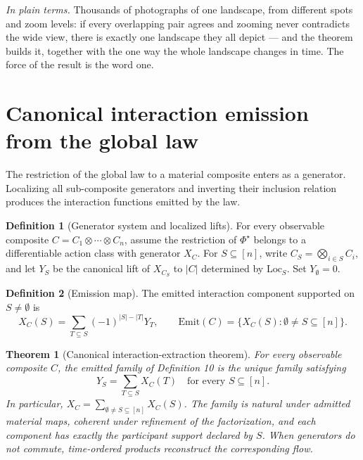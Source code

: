 \documentclass[11pt]{article}
\newtheorem{theorem}{Theorem}
\theoremstyle{definition}
\newtheorem{definition}{Definition}
\newcommand{\plainterms}{\emph{In plain terms.}}
\begin{document}
\noindent\plainterms{} Thousands of photographs of one landscape, from different spots and zoom levels: if every overlapping pair agrees and zooming never contradicts the wide view, there is exactly one landscape they all depict --- and the theorem builds it, together with the one way the whole landscape changes in time. The force of the result is the word one.

\section{Canonical interaction emission from the global law}

The restriction of the global law to a material composite enters as a generator. Localizing all sub-composite generators and inverting their inclusion relation produces the interaction functions emitted by the law.

\begin{definition}[Generator system and localized lifts]
For every observable composite $C = C_1 \otimes \cdots \otimes C_n$, assume the restriction of $\Phi^{\star}$ belongs to a differentiable action class with generator $X_C$. For $S \subseteq [n]$, write $C_S = \bigotimes_{i \in S} C_i$, and let $Y_S$ be the canonical lift of $X_{C_S}$ to $|C|$ determined by $\mathrm{Loc}_S$. Set $Y_\emptyset = 0$.
\end{definition}

\begin{definition}[Emission map]
The emitted interaction component supported on $S \neq \emptyset$ is
\begin{equation}
X_C(S) = \sum_{T \subseteq S} (-1)^{|S|-|T|} Y_T, \qquad \mathrm{Emit}(C) = \{X_C(S) : \emptyset \neq S \subseteq [n]\}. \tag{S3}
\end{equation}
\end{definition}

\begin{theorem}[Canonical interaction-extraction theorem]
\label{thm:canonical-interaction-extraction}
For every observable composite $C$, the emitted family of Definition 10 is the unique family satisfying
\begin{equation}
Y_S = \sum_{T \subseteq S} X_C(T) \quad \text{for every } S \subseteq [n]. \tag{S4}
\end{equation}
In particular, $X_C = \sum_{\emptyset \neq S \subseteq [n]} X_C(S)$. The family is natural under admitted material maps, coherent under refinement of the factorization, and each component has exactly the participant support declared by $S$. When generators do not commute, time-ordered products reconstruct the corresponding flow.
\end{theorem}
\end{document}
